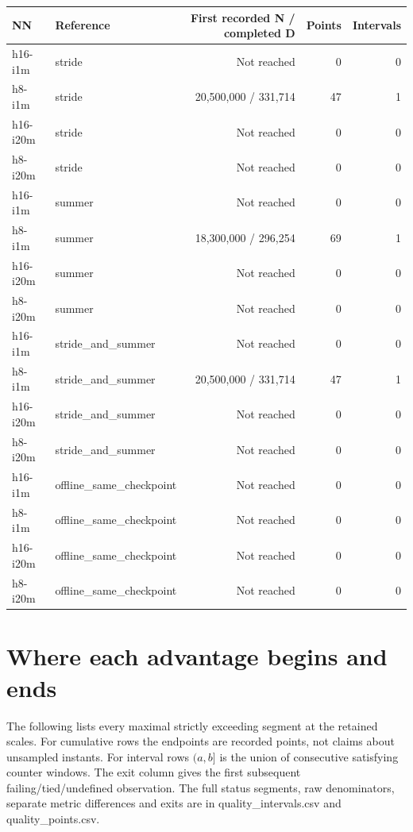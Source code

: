 \documentclass[10pt]{article}
\begin{document}
\begin{center}\scriptsize
\begin{tabular}{llrrr}
\toprule
NN & Reference & First recorded N / completed D & Points & Intervals \\
\midrule
h16-i1m & stride & Not reached & 0 & 0 \\
h8-i1m & stride & 20,500,000 / 331,714 & 47 & 1 \\
h16-i20m & stride & Not reached & 0 & 0 \\
h8-i20m & stride & Not reached & 0 & 0 \\
h16-i1m & summer & Not reached & 0 & 0 \\
h8-i1m & summer & 18,300,000 / 296,254 & 69 & 1 \\
h16-i20m & summer & Not reached & 0 & 0 \\
h8-i20m & summer & Not reached & 0 & 0 \\
h16-i1m & stride\_and\_summer & Not reached & 0 & 0 \\
h8-i1m & stride\_and\_summer & 20,500,000 / 331,714 & 47 & 1 \\
h16-i20m & stride\_and\_summer & Not reached & 0 & 0 \\
h8-i20m & stride\_and\_summer & Not reached & 0 & 0 \\
h16-i1m & offline\_same\_checkpoint & Not reached & 0 & 0 \\
h8-i1m & offline\_same\_checkpoint & Not reached & 0 & 0 \\
h16-i20m & offline\_same\_checkpoint & Not reached & 0 & 0 \\
h8-i20m & offline\_same\_checkpoint & Not reached & 0 & 0 \\
\bottomrule
\end{tabular}\end{center}

\clearpage\section{Where each advantage begins and ends}

The following lists every maximal strictly exceeding segment at the retained scales. For cumulative rows the endpoints are recorded points, not claims about unsampled instants. For interval rows $(a,b]$ is the union of consecutive satisfying counter windows. The exit column gives the first subsequent failing/tied/undefined observation. The full status segments, raw denominators, separate metric differences and exits are in quality\_intervals.csv and quality\_points.csv.
\end{document}
